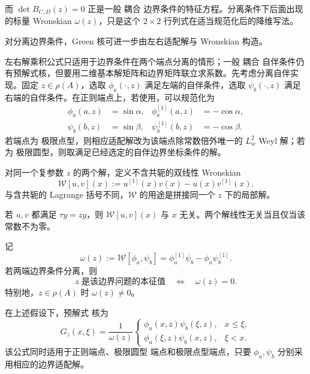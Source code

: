 而 $\det B_{C,D}(z)=0$ 正是一般 耦合 边界条件的特征方程。分离条件下后面出现的标量 Wronskian $\omega(z)$，只是这个 $2\times2$ 行列式在适当规范化后的降维写法。

对分离边界条件，Green 核可进一步由左右适配解与 Wronskian 构造。

左右解乘积公式只适用于边界条件在两个端点分离的情形；一般 耦合 自伴条件仍有预解式核，但要用二维基本解矩阵和边界矩阵联立求系数。先考虑分离自伴实现。固定 $z\in\rho(A)$，选取 $\phi_a(\cdot,z)$ 满足左端的自伴条件，选取 $\psi_b(\cdot,z)$ 满足右端的自伴条件。在正则端点上，若使用，可以规范化为
\begin{align}
 \phi_a(a,z)&=\sin\alpha,
 &\phi_a^{[1]}(a,z)&=-\cos\alpha,\label{eq:math-sl-left-solution}\\
 \psi_b(b,z)&=\sin\beta,
 &\psi_b^{[1]}(b,z)&=-\cos\beta.\label{eq:math-sl-right-solution}
\end{align}
若端点为 极限点型，则相应适配解改为该端点除常数倍外唯一的 $L^2_w$ Weyl 解；若为 极限圆型，则取满足已经选定的自伴边界坐标条件的解。

对同一个复参数 $z$ 的两个解，定义不含共轭的双线性 Wronskian
\begin{equation*}\mathcal W[u,v](x):=u^{[1]}(x)v(x)-u(x)v^{[1]}(x).
\end{equation*}
与含共轭的 Lagrange 括号不同，$\mathcal W$ 的用途是拼接同一个 $z$ 下的局部解。

\begin{corollary}\label{cor:math-sl-wronskian-constant}
若 $u,v$ 都满足 $\tau y=zy$，则 $\mathcal W[u,v](x)$ 与 $x$ 无关。两个解线性无关当且仅当该常数不为零。
\end{corollary}

记
\begin{equation*}\omega(z):=\mathcal W[\phi_a,\psi_b]
 =\phi_a^{[1]}\psi_b-\phi_a\psi_b^{[1]}.
\end{equation*}
若两端边界条件分离，则
\begin{equation*}z\text{ 是该边界问题的本征值}
 \quad\Longleftrightarrow\quad
 \omega(z)=0.
\end{equation*}
特别地，$z\in\rho(A)$ 时 $\omega(z)\neq0$。

\begin{theorem}\label{thm:math-sl-green-regular}
在上述假设下，预解式 核为
\begin{equation}\label{eq:math-sl-green-regular-formula}
 G_z(x,\xi)=\frac{1}{\omega(z)}
 \begin{cases}
 \phi_a(x,z)\psi_b(\xi,z),&x\le\xi,\\
 \phi_a(\xi,z)\psi_b(x,z),&\xi<x.
 \end{cases}
\end{equation}
该公式同时适用于正则端点、极限圆型 端点和极限点型端点，只要 $\phi_a,\psi_b$ 分别采用相应的边界适配解。
\end{theorem}

